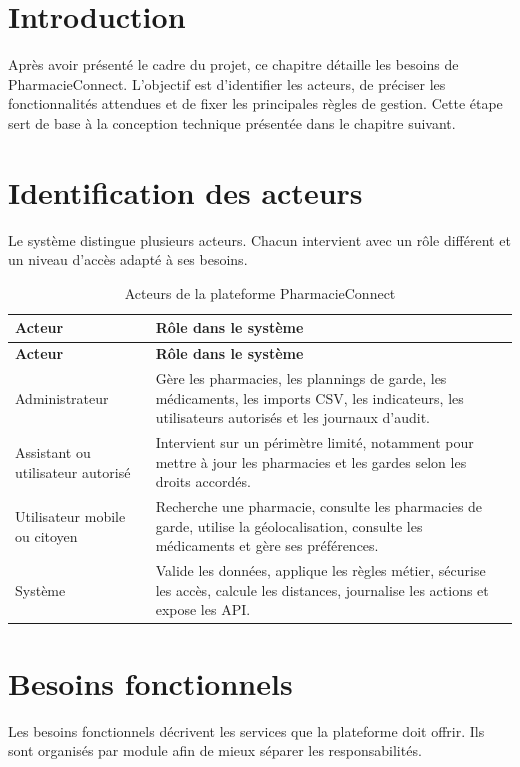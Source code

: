 \section{Introduction}

Après avoir présenté le cadre du projet, ce chapitre détaille les besoins de PharmacieConnect. L'objectif
est d'identifier les acteurs, de préciser les fonctionnalités attendues et de fixer les principales règles
de gestion. Cette étape sert de base à la conception technique présentée dans le chapitre suivant.

\section{Identification des acteurs}

Le système distingue plusieurs acteurs. Chacun intervient avec un rôle différent et un niveau d'accès
adapté à ses besoins.

\begin{longtable}{L{4cm}L{10cm}}
    \caption{Acteurs de la plateforme PharmacieConnect}\\
    \toprule
    \textbf{Acteur} & \textbf{Rôle dans le système} \\
    \midrule
    \endfirsthead
    \toprule
    \textbf{Acteur} & \textbf{Rôle dans le système} \\
    \midrule
    \endhead
    Administrateur & Gère les pharmacies, les plannings de garde, les médicaments, les imports CSV, les indicateurs, les utilisateurs autorisés et les journaux d'audit. \\
    Assistant ou utilisateur autorisé & Intervient sur un périmètre limité, notamment pour mettre à jour les pharmacies et les gardes selon les droits accordés. \\
    Utilisateur mobile ou citoyen & Recherche une pharmacie, consulte les pharmacies de garde, utilise la géolocalisation, consulte les médicaments et gère ses préférences. \\
    Système & Valide les données, applique les règles métier, sécurise les accès, calcule les distances, journalise les actions et expose les API. \\
    \bottomrule
\end{longtable}

\section{Besoins fonctionnels}

Les besoins fonctionnels décrivent les services que la plateforme doit offrir. Ils sont organisés par
module afin de mieux séparer les responsabilités.

